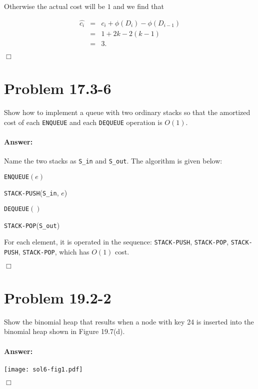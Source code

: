 \documentclass[a4paper,10pt]{article}
\newcommand{\problem}[1]{\section*{Problem #1}}
\newcommand{\answer}{\paragraph{Answer:}}
\newcommand{\qed}{\hfill \ensuremath{\Box}}
\begin{document}
Otherwise the actual cost will be $1$ and we find that

\begin{eqnarray*}
\widehat{c_i} &=& c_i + \phi(D_i) - \phi(D_{i-1})\\
&=&1 + 2k - 2(k - 1)\\
&=& 3.
\end{eqnarray*}

\qed

\problem{17.3-6}

Show how to implement a queue with two ordinary stacks so that the amortized cost of each \texttt{ENQUEUE} and each \texttt{DEQUEUE} operation is $O(1)$.

\answer

Name the two stacks as \texttt{S\_in} and \texttt{S\_out}. The algorithm is given below:

\begin{algorithm}[H]
\caption{\texttt{ENQUEUE}$(e)$}
\texttt{STACK-PUSH}(\texttt{S\_in}, $e$)
\end{algorithm}

\begin{algorithm}[H]
\caption{\texttt{DEQUEUE}$()$}
\Return \texttt{STACK-POP}(\texttt{S\_out})
\end{algorithm}

For each element, it is operated in the sequence: \texttt{STACK-PUSH}, \texttt{STACK-POP}, 
\texttt{STACK-PUSH}, \texttt{STACK-POP}, which has $O(1)$ cost.

\qed

\problem{19.2-2}

Show the binomial heap that results when a node with key 24 is inserted into the binomial heap shown in Figure 19.7(d).

\answer

\begin{center}
  \texttt{[image: sol6-fig1.pdf]}
\end{center}

\qed
\end{document}
